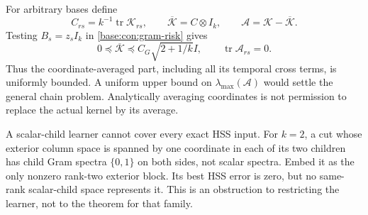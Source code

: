 \documentclass[11pt,oneside,openany,a4paper]{book}
\numberwithin{equation}{chapter}
\theoremstyle{definition}
\theoremstyle{remark}
\newcommand{\proofstep}[1]{\par\addvspace{.45\baselineskip}\Needspace{3\baselineskip}\textbf{#1}\par\nobreak}
\newcommand{\R}{\mathbb R}\newcommand{\E}{\mathbb E}\newcommand{\Prb}{\mathbb P}\newcommand{\PP}{\mathbb P}
\newcommand{\T}{\mathsf T}\newcommand{\Id}{I}
\newcommand{\F}[1]{\left\lVert#1\right\rVert_F}
\newcommand{\N}[1]{\left\lVert#1\right\rVert}
\newcommand{\op}[1]{\left\lVert#1\right\rVert_{\rm op}}
\newcommand{\ip}[2]{\left\langle#1,#2\right\rangle_F}
\DeclareMathOperator{\tr}{tr}\DeclareMathOperator{\rank}{rank}
\DeclareMathOperator{\diag}{blockdiag}\DeclareMathOperator{\range}{range}
\DeclareMathOperator{\HSS}{HSS}\DeclareMathOperator{\dist}{dist}
\DeclareMathOperator{\Var}{Var}\DeclareMathOperator{\supp}{supp}
\newcommand{\UC}{\mathcal U}\newcommand{\VC}{\mathcal V}\newcommand{\err}{\mathcal E}
\newcommand{\Sn}[2]{\left\lVert#1\right\rVert_{S_{#2}}}
\newcommand{\Cov}{\mathsf C}\newcommand{\Loss}{\mathsf L}\newcommand{\Fil}{\mathcal F}
\DeclareMathOperator{\diver}{div}\DeclareMathOperator{\vecop}{vec}\DeclareMathOperator{\Gammafun}{Gamma}
\begin{document}
For arbitrary bases define
\[
 C_{rs}=k^{-1}\tr\mathcal K_{rs},\qquad
 \overline{\mathcal K}=C\otimes I_k,
 \qquad\mathcal A=\mathcal K-\overline{\mathcal K}.
\]
Testing $B_s=z_sI_k$ in \eqref{base:con:gram-risk} gives
\begin{equation}\label{base:con:anisotropic}
 0\preceq\overline{\mathcal K}\preceq C_G\sqrt{2+1/k}I,
 \qquad \tr\mathcal A_{rs}=0.
\end{equation}
Thus the coordinate-averaged part, including all its temporal cross terms, is uniformly bounded. A uniform upper bound on $\lambda_{\max}(\mathcal A)$ would settle the general chain problem. Analytically averaging coordinates is not permission to replace the actual kernel by its average.

A scalar-child learner cannot cover every exact HSS input. For $k=2$, a cut whose exterior column space is spanned by one coordinate in each of its two children has child Gram spectra $\{0,1\}$ on both sides, not scalar spectra. Embed it as the only nonzero rank-two exterior block. Its best HSS error is zero, but no same-rank scalar-child space represents it. This is an obstruction to restricting the learner, not to the theorem for that family.


\endgroup

\begingroup
\let\R\relax
\newcommand{\R}{\mathbb R}
\let\E\relax
\newcommand{\E}{\mathbb E}
\let\Prb\relax
\newcommand{\Prb}{\mathbb P}
\let\T\relax
\newcommand{\T}{\mathsf T}
\let\F\relax
\newcommand{\F}[1]{\left\lVert#1\right\rVert_{F}}
\let\N\relax
\newcommand{\N}[1]{\left\lVert#1\right\rVert}
\let\ip\relax
\newcommand{\ip}[2]{\left\langle#1,#2\right\rangle_F}
\let\tr\relax
\newcommand{\tr}{\operatorname{tr}}
\let\rank\relax
\newcommand{\rank}{\operatorname{rank}}
\let\diag\relax
\newcommand{\diag}{\operatorname{blockdiag}}
\let\range\relax
\newcommand{\range}{\operatorname{range}}
\let\OPT\relax
\newcommand{\OPT}{\operatorname{OPT}}
\let\HSS\relax
\newcommand{\HSS}{\operatorname{HSS}}
\let\diver\relax
\newcommand{\diver}{\operatorname{div}}
\let\Var\relax
\newcommand{\Var}{\operatorname{Var}}
\let\UC\relax
\newcommand{\UC}{\mathcal U}
\let\VC\relax
\newcommand{\VC}{\mathcal V}
\let\err\relax
\newcommand{\err}{\mathcal E}
\let\proofstep\relax
\newcommand{\proofstep}[1]{\par\addvspace{.45\baselineskip}\Needspace{3\baselineskip}\textbf{#1}\par\nobreak}
\let\op\relax
\newcommand{\op}[1]{\left\lVert#1\right\rVert_{\mathrm{op}}}
\let\Sn\relax
\newcommand{\Sn}[2]{\left\lVert#1\right\rVert_{S_{#2}}}
\let\Cov\relax
\newcommand{\Cov}{\mathsf C}
\let\Loss\relax
\newcommand{\Loss}{\mathsf L}
\let\Fil\relax
\newcommand{\Fil}{\mathcal F}
\let\Id\relax
\newcommand{\Id}{I}
\let\supp\relax
\newcommand{\supp}{\operatorname{supp}}
\let\vecop\relax
\newcommand{\vecop}{\operatorname{vec}}
\let\Gammafun\relax
\newcommand{\Gammafun}{\operatorname{Gamma}}
\end{document}
